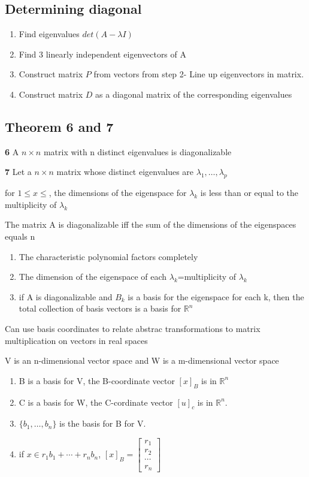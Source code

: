 \subsection{Determining diagonal}
\begin{enumerate}
	\item Find eigenvalues $det(A-\lambda I)$	
	\item Find 3 linearly independent eigenvectors of A
	\item Construct matrix $P$ from vectors from step 2- Line up eigenvectors in matrix.
	\item Construct matrix $D$ as a diagonal matrix of the corresponding eigenvalues
\end{enumerate}

\subsection{Theorem 6 and 7}


\textbf{6}
A $n\times n$ matrix with n distinct eigenvalues is diagonalizable 

\hfill
\hfill


\textbf{7}
Let a $n\times n$ matrix whose distinct eigenvalues are $\lambda_{1},\ldots,\lambda_{p}$

for $1\leq x \leq$, the dimensions of the eigenspace for $\lambda_{k}$ is less than or equal to the multiplicity of $\lambda_{k}$

The matrix A is diagonalizable iff the sum of the dimensions of the eigenspaces equals n
\begin{enumerate}
	\item The characteristic polynomial factors completely 
	\item The dimension of the eigenspace of each $\lambda_{k}$=multiplicity of $\lambda_{k}$
	\item if A is diagonalizable and $B_{k}$ is a basis for the eigenspace for each k, then the total collection of basis vectors is a basis for $\mathbb{R}^{n}$
\end{enumerate}


Can use basis coordinates to relate abstrac transformations to matrix multiplication on vectors in real spaces

V is an n-dimensional vector space and W is a m-dimensional vector space
\begin{enumerate}
	\item B is a basis for V, the B-coordinate vector $[x]_{B}$ is in $\mathbb{R}^{n}$
	\item C is a basis for W, the C-cordinate vector $[u]_{c}$ is in $\mathbb{R}^{n}$.
	\item $\{b_{1},\ldots,b_{n}\}$ is the basis for B for V.
	\item if $x\in r_{1}b_{1}+\cdots + r_{n}b_{n}$, $[x]_{B}=
		\begin{bmatrix}
		r_{1}\\r_{2}\\\cdots\\r_{n}	
		\end{bmatrix}$
\end{enumerate}


